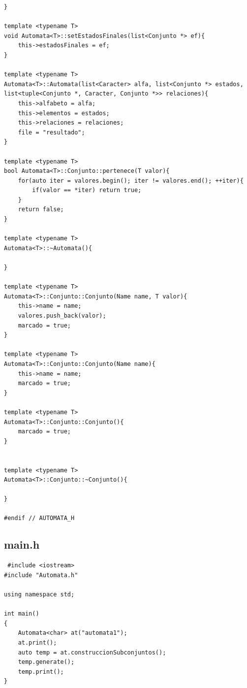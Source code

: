 \documentclass[a4paper,12pt]{article}
\begin{document}
\begin{lstlisting}
}

template <typename T>
void Automata<T>::setEstadosFinales(list<Conjunto *> ef){
    this->estadosFinales = ef;
}

template <typename T>
Automata<T>::Automata(list<Caracter> alfa, list<Conjunto *> estados, list<tuple<Conjunto *, Caracter, Conjunto *>> relaciones){
    this->alfabeto = alfa;
    this->elementos = estados;
    this->relaciones = relaciones;
    file = "resultado";
}

template <typename T>
bool Automata<T>::Conjunto::pertenece(T valor){
    for(auto iter = valores.begin(); iter != valores.end(); ++iter){
        if(valor == *iter) return true;
    }
    return false;
}

template <typename T>
Automata<T>::~Automata(){

}

template <typename T>
Automata<T>::Conjunto::Conjunto(Name name, T valor){
    this->name = name;
    valores.push_back(valor);
    marcado = true;
}

template <typename T>
Automata<T>::Conjunto::Conjunto(Name name){
    this->name = name;
    marcado = true;
}

template <typename T>
Automata<T>::Conjunto::Conjunto(){
    marcado = true;
}


template <typename T>
Automata<T>::Conjunto::~Conjunto(){

}

#endif // AUTOMATA_H
\end{lstlisting}

\subsection{main.h}

\begin{lstlisting}
 #include <iostream>
#include "Automata.h"

using namespace std;

int main()
{
    Automata<char> at("automata1");
    at.print();
    auto temp = at.construccionSubconjuntos();
    temp.generate();
    temp.print();
}
\end{lstlisting}
\end{document}

